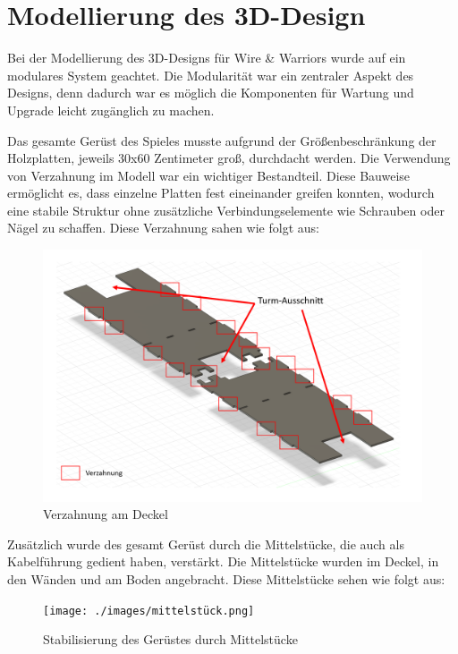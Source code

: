 \section{Modellierung des 3D-Design}

Bei der Modellierung des 3D-Designs für Wire \& Warriors wurde auf ein modulares System geachtet. Die Modularität war ein zentraler Aspekt des Designs, denn dadurch war es möglich die Komponenten für Wartung und Upgrade leicht zugänglich zu machen.

Das gesamte Gerüst des Spieles musste aufgrund der Größenbeschränkung der Holzplatten, jeweils 30x60 Zentimeter groß, durchdacht werden. Die Verwendung von Verzahnung im Modell war ein wichtiger Bestandteil. Diese Bauweise ermöglicht es, dass einzelne Platten fest eineinander greifen konnten, wodurch eine stabile Struktur ohne zusätzliche Verbindungselemente wie Schrauben oder Nägel zu schaffen. Diese Verzahnung sahen wie folgt aus:


\begin{figure}[H]
 \centerline{\includegraphics[width=\textwidth,scale=1]{./images/verzahnung.png}}
 \caption{Verzahnung am Deckel}\label{imageLabel}
\end{figure} 

Zusätzlich wurde des gesamt Gerüst durch die Mittelstücke, die auch als Kabelführung gedient haben, verstärkt. Die Mittelstücke wurden im Deckel, in den Wänden und am Boden angebracht. Diese Mittelstücke sehen wie folgt aus:

\begin{figure}[H]
 \centerline{\texttt{[image: ./images/mittelstück.png]}}
 \caption{Stabilisierung des Gerüstes durch Mittelstücke}\label{imageLabel}
\end{figure} 

